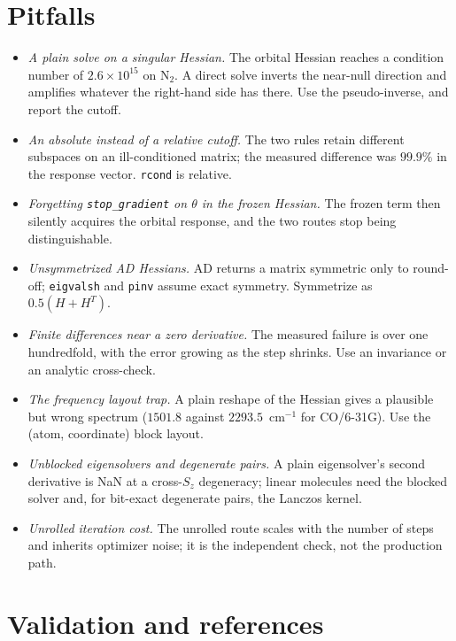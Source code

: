 \section{Pitfalls}
\label{sec:hessian-pitfalls}

\begin{itemize}
\item \emph{A plain solve on a singular Hessian.}  The orbital Hessian
  reaches a condition number of $2.6\times10^{15}$ on N$_2$.  A direct
  solve inverts the near-null direction and amplifies whatever the
  right-hand side has there.  Use the pseudo-inverse, and report the
  cutoff.
\item \emph{An absolute instead of a relative cutoff.}  The two rules
  retain different subspaces on an ill-conditioned matrix; the measured
  difference was $99.9\%$ in the response vector.  \texttt{rcond} is
  relative.
\item \emph{Forgetting \texttt{stop\_gradient} on $\theta$ in the
  frozen Hessian.}  The frozen term then silently acquires the orbital
  response, and the two routes stop being distinguishable.
\item \emph{Unsymmetrized AD Hessians.}  AD returns a matrix symmetric
  only to round-off; \texttt{eigvalsh} and \texttt{pinv} assume exact
  symmetry.  Symmetrize as $0.5(H+H^{T})$.
\item \emph{Finite differences near a zero derivative.}  The measured
  failure is over one hundredfold, with the error growing as the step
  shrinks.  Use an invariance or an analytic cross-check.
\item \emph{The frequency layout trap.}  A plain reshape of the Hessian
  gives a plausible but wrong spectrum ($1501.8$ against
  $2293.5$~cm$^{-1}$ for CO/6-31G).  Use the (atom, coordinate) block
  layout.
\item \emph{Unblocked eigensolvers and degenerate pairs.}  A plain
  eigensolver's second derivative is NaN at a cross-$S_z$ degeneracy;
  linear molecules need the blocked solver and, for bit-exact
  degenerate pairs, the Lanczos kernel.
\item \emph{Unrolled iteration cost.}  The unrolled route scales with
  the number of steps and inherits optimizer noise; it is the
  independent check, not the production path.
\end{itemize}

\section{Validation and references}
\label{sec:hessian-validation}


